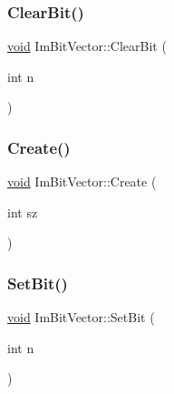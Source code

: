 \mbox{\label{structImBitVector_aeca31d497bf4ceb032dfb92bf5515a40}} 
\subsubsection{\texorpdfstring{Clear\+Bit()}{ClearBit()}}
{\footnotesize\ttfamily \hyperlink{imgui__impl__opengl3__loader_8h_ac668e7cffd9e2e9cfee428b9b2f34fa7}{void} Im\+Bit\+Vector\+::\+Clear\+Bit (\begin{DoxyParamCaption}\item[{int}]{n }\end{DoxyParamCaption})\hspace{0.3cm}{\ttfamily [inline]}}

\mbox{\label{structImBitVector_a2e25a0809000ad27bfc3fb89f3d04829}} 
\subsubsection{\texorpdfstring{Create()}{Create()}}
{\footnotesize\ttfamily \hyperlink{imgui__impl__opengl3__loader_8h_ac668e7cffd9e2e9cfee428b9b2f34fa7}{void} Im\+Bit\+Vector\+::\+Create (\begin{DoxyParamCaption}\item[{int}]{sz }\end{DoxyParamCaption})\hspace{0.3cm}{\ttfamily [inline]}}

\mbox{\label{structImBitVector_afab0abbd320b1f33d1988760be7cd39b}} 
\subsubsection{\texorpdfstring{Set\+Bit()}{SetBit()}}
{\footnotesize\ttfamily \hyperlink{imgui__impl__opengl3__loader_8h_ac668e7cffd9e2e9cfee428b9b2f34fa7}{void} Im\+Bit\+Vector\+::\+Set\+Bit (\begin{DoxyParamCaption}\item[{int}]{n }\end{DoxyParamCaption})\hspace{0.3cm}{\ttfamily [inline]}}

